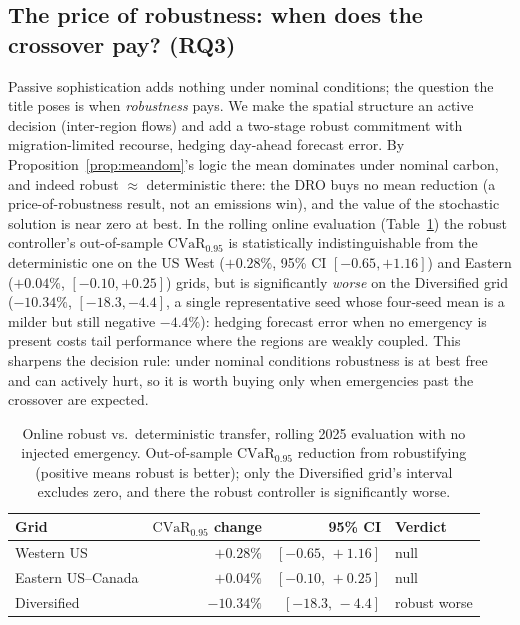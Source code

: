 \documentclass[12pt]{article}
\newcommand{\CVaR}{\mathrm{CVaR}}
\begin{document}
\subsection{The price of robustness: when does the crossover pay?
(RQ3)}\label{sec:res-crossover}
Passive sophistication adds nothing under nominal conditions; the question the
title poses is when \emph{robustness} pays. We make the spatial structure an active
decision (inter-region flows) and add a two-stage robust commitment with
migration-limited recourse, hedging day-ahead forecast error. By
Proposition~\ref{prop:meandom}'s logic the mean dominates under nominal carbon, and
indeed robust $\approx$ deterministic there: the DRO buys no mean reduction (a
price-of-robustness result, not an emissions win), and the value of the stochastic
solution is near zero at best. In the rolling online evaluation (Table~\ref{tab:online}) the
robust controller's out-of-sample $\CVaR_{0.95}$ is statistically indistinguishable from
the deterministic one on the US West ($+0.28\%$, 95\% CI $[-0.65,+1.16]$) and Eastern
($+0.04\%$, $[-0.10,+0.25]$) grids, but is significantly \emph{worse} on the Diversified
grid ($-10.34\%$, $[-18.3,-4.4]$, a single representative seed whose four-seed mean is a
milder but still negative $-4.4\%$): hedging forecast error when no emergency is present
costs tail performance where the regions are weakly coupled. This sharpens the decision
rule: under nominal conditions robustness is at best free and
can actively hurt, so it is worth buying only when emergencies past the crossover are
expected.

\begin{table}[t]
\centering\small
\caption{Online robust vs.\ deterministic transfer, rolling 2025 evaluation with no
injected emergency. Out-of-sample $\CVaR_{0.95}$ reduction from robustifying (positive
means robust is better); only the Diversified grid's interval excludes zero, and there
the robust controller is significantly worse.}
\label{tab:online}
\begin{tabular}{lrrl}
\toprule
Grid & $\CVaR_{0.95}$ change & 95\% CI & Verdict \\
\midrule
Western US         & $+0.28\%$  & $[-0.65,\,+1.16]$  & null \\
Eastern US--Canada & $+0.04\%$  & $[-0.10,\,+0.25]$  & null \\
Diversified        & $-10.34\%$ & $[-18.3,\,-4.4]$ & robust worse \\
\bottomrule
\end{tabular}
\end{table}
\end{document}
